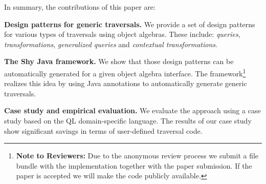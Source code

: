 In summary, the contributions of this paper are:

\begin{itemize*}

\item {\bf Design patterns for generic traversals.} We provide a set of design
patterns for various types of traversals using object algebras. These include:
\emph{queries}, \emph{transformations},
\emph{generalized queries} and \emph{contextual transformations}.

\item {\bf The Shy Java framework.} We show that those design patterns
  can be automatically generated for a given object algebra
  interface. The \name framework\footnote{{\bf
      Note to Reviewers:} Due to the anonymous review process we
    submit a file bundle with the implementation together with the paper submission. If the
    paper is accepted we will make the code publicly available.} realizes this idea by using
   Java annotations to automatically generate generic traversals.

\item {\bf Case study and empirical evaluation.} We evaluate the
  approach using a case study based on the QL domain-specific
  language. The results of our case study show significant savings in
  terms of user-defined traversal code.
\end{itemize*}
